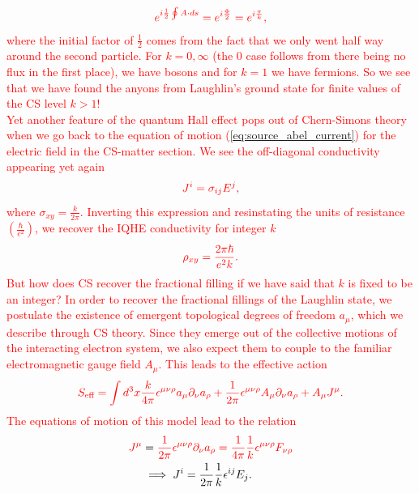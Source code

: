 \begin{align}
    \textcolor{red}{e^{i \frac{1}{2} \oint A \cdot ds}=e^{i \frac{\Phi}{2}}= e^{i \frac{\pi}{k}},}
\end{align}
 \textcolor{red}{where the initial factor of $\frac{1}{2}$ comes from the fact that we only went half way around the second particle. For $k=0,\infty$ (the 0 case follows from there being no flux in the first place), we have bosons and for $k=1$ we have fermions. So we see that we have found the anyons from Laughlin's ground state for finite values of the CS level $k>1$!}\\
\indent \textcolor{red}{Yet another feature of the quantum Hall effect pops out of Chern-Simons theory when we go back to the equation of motion (\ref{eq:source_abel_current}) for the electric field in the CS-matter section. We see the off-diagonal conductivity appearing yet again}
\begin{align}
    \textcolor{red}{J^{i} = \sigma_{ij}E^j,}
\end{align}
 \textcolor{red}{where $\sigma_{xy}=\frac{k}{2\pi}$. Inverting this expression and resinstating the units of resistance $\left(\frac{\hbar}{e^2}\right)$, we recover the IQHE conductivity for integer $k$}
\begin{align}
    \textcolor{red}{\rho_{xy} =\frac{2\pi \hbar}{e^2 k}.}
\end{align}
 \textcolor{red}{But how does CS recover the fractional filling if we have said that $k$ is fixed to be an integer? In order to recover the fractional fillings of the Laughlin state, we postulate the existence of emergent topological degrees of freedom $a_{\mu}$, which we describe through CS theory. Since they emerge out of the collective motions of the interacting electron system, we also expect them to couple to the familiar electromagnetic gauge field $A_{\mu}$. This leads to the effective action}
\begin{align}
    \textcolor{red}{S_{\text{eff}} = \int d^3x \frac{k}{4\pi} \epsilon^{\mu \nu \rho} a_{\mu} \partial_{\nu} a_{\rho} + \frac{1}{2 \pi} \epsilon^{\mu \nu \rho} A_{\mu} \partial_{\nu}a_{\rho}+ A_{\mu} J^{\mu}.}
\end{align}
 \textcolor{red}{The equations of motion of this model lead to the relation}
\begin{align}
    \textcolor{red}{J^{\mu}} &= \textcolor{red}{\frac{1}{2\pi} \epsilon^{\mu \nu \rho} \partial_\nu a_{\rho} = \frac{1}{4\pi} \frac{1}{k} \epsilon^{\mu \nu \rho} F_{\nu \rho} }\\
    &\implies J^{i} = \frac{1}{2 \pi} \frac{1}{k} \epsilon^{i j} E_{j}.
\end{align}
